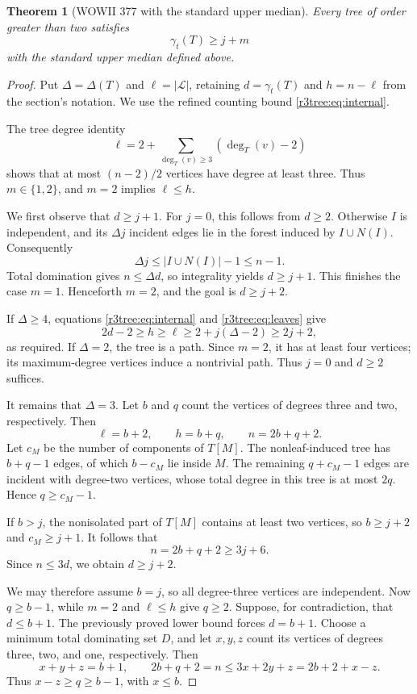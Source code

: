 \documentclass[11pt,a4paper]{article}
\newtheorem{theorem}{Theorem}[section]
\theoremstyle{remark}
\begin{document}
\begin{theorem}[WOWII 377 with the standard upper median]
\label{r3tree:thm:377}
Every tree of order greater than two satisfies
\[
\gamma_t(T)\ge j+m
\]
with the standard upper median defined above.
\end{theorem}
\begin{proof}
Put $\Delta=\Delta(T)$ and $\ell=|\mathcal L|$, retaining
$d=\gamma_t(T)$ and $h=n-\ell$ from the section's notation.
We use the refined counting bound \eqref{r3tree:eq:internal}.

The tree degree identity
\begin{equation}\label{r3tree:eq:leaves}
\ell=2+\sum_{\deg_T(v)\ge3}(\deg_T(v)-2)
\end{equation}
shows that at most $(n-2)/2$ vertices have degree at least three.
Thus $m\in\{1,2\}$, and $m=2$ implies $\ell\le h$.

We first observe that $d\ge j+1$.  For $j=0$, this follows from
$d\ge2$.  Otherwise $I$ is independent, and its $\Delta j$
incident edges lie in the forest induced by $I\cup N(I)$.
Consequently
\[
\Delta j\le |I\cup N(I)|-1\le n-1.
\]
Total domination gives $n\le\Delta d$, so integrality yields
$d\ge j+1$.
This finishes the case $m=1$.  Henceforth $m=2$, and the goal is
$d\ge j+2$.

If $\Delta\ge4$, equations \eqref{r3tree:eq:internal} and
\eqref{r3tree:eq:leaves} give
\[
2d-2\ge h\ge\ell\ge2+j(\Delta-2)\ge2j+2,
\]
as required.  If $\Delta=2$, the tree is a path.  Since $m=2$,
it has at least four vertices; its maximum-degree vertices induce
a nontrivial path.  Thus $j=0$ and $d\ge2$ suffices.

It remains that $\Delta=3$.  Let $b$ and $q$ count the vertices of
degrees three and two, respectively.  Then
\[
\ell=b+2,\qquad h=b+q,\qquad n=2b+q+2.
\]
Let $c_M$ be the number of components of $T[M]$.
The nonleaf-induced tree has $b+q-1$ edges, of which $b-c_M$ lie
inside $M$.  The remaining $q+c_M-1$ edges are incident with
degree-two vertices, whose total degree in this tree is at most
$2q$.  Hence $q\ge c_M-1$.

If $b>j$, the nonisolated part of $T[M]$ contains at least two
vertices, so $b\ge j+2$ and $c_M\ge j+1$.  It follows that
\[
n=2b+q+2\ge3j+6.
\]
Since $n\le3d$, we obtain $d\ge j+2$.

We may therefore assume $b=j$, so all degree-three vertices are
independent.  Now $q\ge b-1$, while $m=2$ and $\ell\le h$ give
$q\ge2$.  Suppose, for contradiction, that $d\le b+1$.
The previously proved lower bound forces $d=b+1$.
Choose a minimum total dominating set $D$, and let $x,y,z$ count
its vertices of degrees three, two, and one, respectively.
Then
\[
x+y+z=b+1,\qquad
2b+q+2=n\le3x+2y+z=2b+2+x-z.
\]
Thus $x-z\ge q\ge b-1$, with $x\le b$.


\end{proof}
\end{document}
